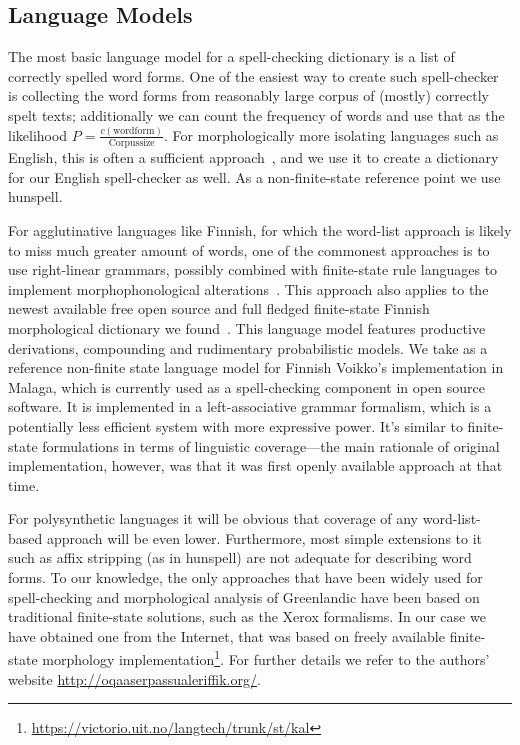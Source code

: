 \documentclass[free]{flammie}
\begin{document}
\subsection{Language Models}
\label{subsec:language-models}

The most basic language model for a spell-checking dictionary is a list of
correctly spelled word forms. One of the easiest way to create such 
spell-checker is collecting the word forms from reasonably large corpus of
(mostly) correctly spelt texts; additionally we can count the frequency of words
and use that as the likelihood $P=\frac{c(\mathrm{wordform})}{\mathrm{Corpus size}}$.
For morphologically more isolating languages such as English, this is
often a sufficient
approach~\cite{norvig/2010}, and we use it to create a dictionary
for our English
spell-checker as well. As a non-finite-state reference point we use
hunspell.

For agglutinative languages like Finnish, for which the word-list approach is
likely to miss much greater amount of words, one of the commonest approaches is
to use right-linear grammars, possibly combined with finite-state rule
languages to implement morphophonological alterations~\cite{koskenniemi/1983}.
This approach also applies to the newest available free open source and full
fledged finite-state Finnish morphological dictionary we
found~\cite{pirinen/2011/nodalida}. This language model features productive
derivations, compounding and rudimentary probabilistic models.  We take as a
reference non-finite state language model for Finnish Voikko's implementation
in Malaga, which is currently used as a spell-checking component in open source
software. It is implemented in a left-associative grammar formalism, which is a
potentially less efficient system with more expressive power. It's similar to
finite-state formulations in terms of linguistic coverage---the main rationale
of original implementation, however, was that it was first openly available
approach at that time.

For polysynthetic languages it will be obvious that coverage of any
word-list-based approach will be even lower. Furthermore, most simple
extensions to it such as affix stripping (as in hunspell) are not adequate for
describing word forms. To our knowledge, the only approaches that have been
widely used for spell-checking and morphological analysis of Greenlandic have
been based on traditional finite-state solutions, such as the Xerox formalisms.
In our case we have obtained one from the Internet, that was based on freely
available finite-state morphology
implementation\footnote{\url{https://victorio.uit.no/langtech/trunk/st/kal}}.
For further details we refer to the authors' website
\url{http://oqaaserpassualeriffik.org/}.
\end{document}
